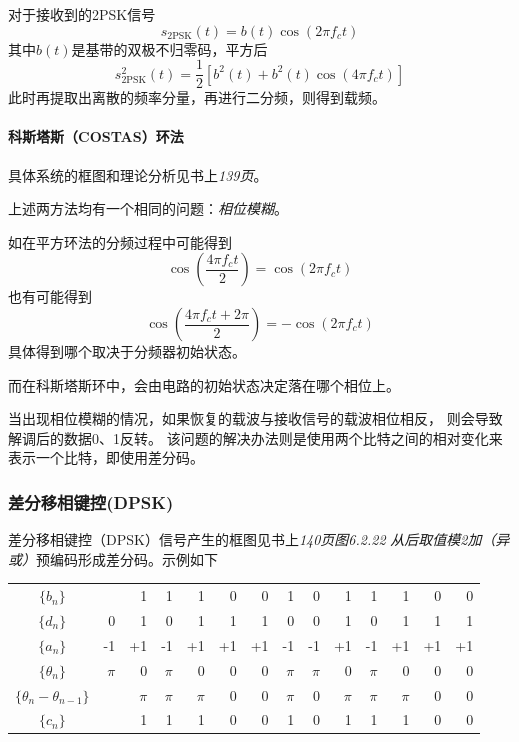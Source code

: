     对于接收到的2PSK信号
    \begin{equation}
        s_{\text{2PSK}}(t)=b(t)\cos(2\pi f_ct)
    \end{equation}
    其中$b(t)$是基带的双极不归零码，平方后
    \begin{equation}
        s^2_{\text{2PSK}}(t)=\frac{1}{2}[b^2(t)+b^2(t)\cos(4\pi f_c t)]
    \end{equation}
    此时再提取出离散的频率分量，再进行二分频，则得到载频。

    \paragraph{科斯塔斯（COSTAS）环法}\mbox{}

    具体系统的框图和理论分析见书上\emph{139页}。

    上述两方法均有一个相同的问题：\emph{相位模糊}。

    如在平方环法的分频过程中可能得到
    \begin{equation}
        \cos\left(\frac{4\pi f_ct}{2}\right)=\cos\left(2\pi f_c t\right)
    \end{equation}
    也有可能得到
    \begin{equation}
        \cos\left(\frac{4\pi f_ct+2\pi}{2}\right)=-\cos\left(2\pi f_c t\right)
    \end{equation}
    具体得到哪个取决于分频器初始状态。

    而在科斯塔斯环中，会由电路的初始状态决定落在哪个相位上。

    当出现相位模糊的情况，如果恢复的载波与接收信号的载波相位相反，
    则会导致解调后的数据0、1反转。
    该问题的解决办法则是使用两个比特之间的相对变化来表示一个比特，即使用差分码。

    \subsubsection{差分移相键控(DPSK)}
    差分移相键控（DPSK）信号产生的框图见书上\emph{140页图6.2.22}
    \emph{从后取值模2加（异或）}预编码形成差分码。示例如下
    \begin{table}[H]
        \centering
        \begin{tabular}{c|*{13}{r}}
            \textcolor{bupt}{$\{b_n\}$}                     &  & 1& 1& 1& 0& 0& 1& 0& 1& 1& 1& 0& 0\\ \Xhline{0.3pt}
            \textcolor{bupt}{$\{d_n\}$}                     & 0& 1& 0& 1& 1& 1& 0& 0& 1& 0& 1& 1& 1\\ \Xhline{0.3pt}
            \textcolor{bupt}{$\{a_n\}$}                     &-1&+1&-1&+1&+1&+1&-1&-1&+1&-1&+1&+1&+1\\ \Xhline{0.3pt}
            \textcolor{bupt}{$\{\theta_n\}$}                &$\pi$&0&$\pi$&0& 0& 0&$\pi$&$\pi$&0&$\pi$&0&0& 0\\ \Xhline{0.3pt}
            \textcolor{bupt}{$\{\theta_n-\theta_{n-1}\}$}   &  &$\pi$&$\pi$&$\pi$& 0& 0&$\pi$& 0&$\pi$&$\pi$&$\pi$& 0& 0\\ \Xhline{0.3pt}
            \textcolor{bupt}{$\{c_n\}$}                     &  & 1& 1& 1& 0& 0& 1& 0& 1& 1& 1& 0& 0
        \end{tabular}
    \end{table}

